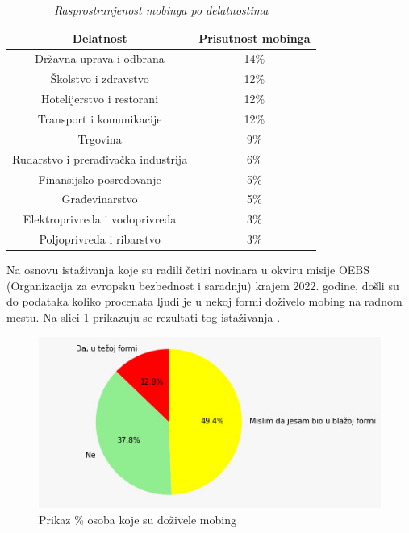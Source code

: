 \documentclass[a4paper]{article}
\begin{document}
    \begin{table}[h]
        \centering
        \begin{tabular}{c|c}
             Delatnost & Prisutnost mobinga \\ \hline
             Državna uprava i odbrana & 14\% \\
             Školstvo i zdravstvo & 12\% \\
             Hotelijerstvo i restorani & 12\% \\
             Transport i komunikacije & 12\% \\
             Trgovina & 9\% \\
             Rudarstvo i prerađivačka industrija & 6\% \\
             Finansijsko posredovanje & 5\% \\
             Građevinarstvo & 5\% \\
             Elektroprivreda i vodoprivreda & 3\% \\
             Poljoprivreda i ribarstvo & 3\%
        \end{tabular}
        \caption{\textit{Rasprostranjenost mobinga po delatnostima}}
        \label{tab1}
    \end{table}
    
    Na osnovu istaživanja koje su radili četiri novinara u okviru misije OEBS (Organizacija za evropsku bezbednost i saradnju) krajem 2022. godine, došli su do podataka koliko procenata ljudi je u nekoj formi doživelo mobing na radnom mestu. Na slici \ref{slika1} prikazuju se rezultati tog istaživanja \cite{istazivanjemobing}.
    
    \begin{figure}[h]
        \centering
        \includegraphics[width=\linewidth]{procenat_ljudi_doziveli_mobing.jpeg}
        \caption{Prikaz \% osoba koje su doživele mobing}
        \label{slika1}
    \end{figure}
    
\end{document}
